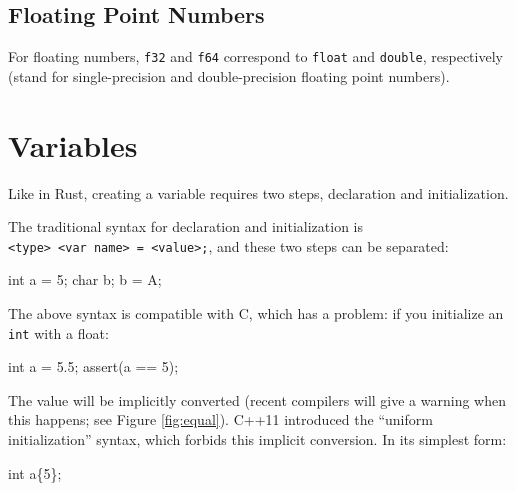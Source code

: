 \documentclass[
]{book}
\newenvironment{Shaded}{\begin{snugshade}}{\end{snugshade}}
\newcommand{\CharTok}[1]{\textcolor[rgb]{0.31,0.60,0.02}{#1}}
\newcommand{\DataTypeTok}[1]{\textcolor[rgb]{0.13,0.29,0.53}{#1}}
\newcommand{\DecValTok}[1]{\textcolor[rgb]{0.00,0.00,0.81}{#1}}
\newcommand{\FloatTok}[1]{\textcolor[rgb]{0.00,0.00,0.81}{#1}}
\newcommand{\NormalTok}[1]{#1}
\newcommand{\OtherTok}[1]{\textcolor[rgb]{0.56,0.35,0.01}{#1}}
\begin{document}
\hypertarget{floating-point-numbers}{%
\subsection{Floating Point Numbers}\label{floating-point-numbers}}

For floating numbers, \texttt{f32} and \texttt{f64} correspond to \texttt{float} and \texttt{double}, respectively
(stand for single-precision and double-precision floating point numbers).

\hypertarget{variables}{%
\section{Variables}\label{variables}}

Like in Rust, creating a variable requires two steps, declaration and initialization.

The traditional syntax for declaration and initialization is \texttt{\textless{}type\textgreater{}\ \textless{}var\ name\textgreater{}\ =\ \textless{}value\textgreater{};},
and these two steps can be separated:

\begin{Shaded}
\begin{Highlighting}[]
\DataTypeTok{int}\NormalTok{ a = }\DecValTok{5}\NormalTok{;}
\DataTypeTok{char}\NormalTok{ b;}
\NormalTok{b = }\CharTok{\textquotesingle{}A\textquotesingle{}}\NormalTok{;}
\end{Highlighting}
\end{Shaded}

The above syntax is compatible with C, which has a problem: if you initialize an \texttt{int} with a float:

\begin{Shaded}
\begin{Highlighting}[]
\DataTypeTok{int}\NormalTok{ a = }\FloatTok{5.5}\NormalTok{;}
\OtherTok{assert}\NormalTok{(a == }\DecValTok{5}\NormalTok{);}
\end{Highlighting}
\end{Shaded}

The value will be implicitly converted (recent compilers will give a warning when this happens; see Figure \ref{fig:equal}).
C++11 introduced the ``uniform initialization'' syntax, which forbids this implicit conversion. In its simplest form:

\begin{Shaded}
\begin{Highlighting}[]
\DataTypeTok{int}\NormalTok{ a\{}\DecValTok{5}\NormalTok{\};}
\end{Highlighting}
\end{Shaded}
\end{document}
